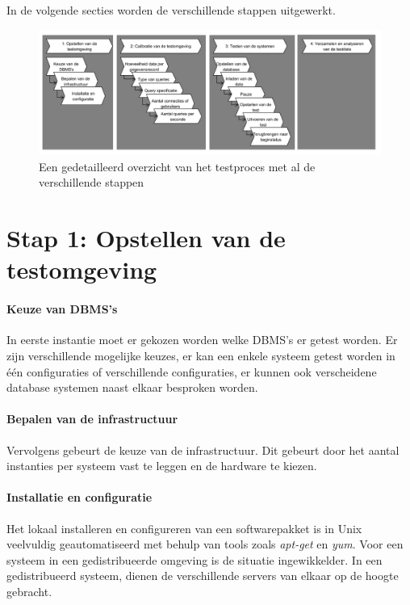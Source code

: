 In de volgende secties worden de verschillende stappen uitgewerkt.  
\begin{figure}[ht!]
\centering
\includegraphics[width=\linewidth]{img/Test-Process-Detailed-Overview}
\caption{Een gedetailleerd overzicht van het testproces met al de verschillende stappen}
\label{fig:test-process-overview}
\end{figure}

\section{Stap 1: Opstellen van de testomgeving}
\paragraph{Keuze van DBMS's} In eerste instantie moet er gekozen worden welke DBMS's er getest worden. Er zijn verschillende mogelijke keuzes, er kan een enkele systeem getest worden in één configuraties of verschillende configuraties, er kunnen ook verscheidene database systemen naast elkaar besproken worden. 

\paragraph{Bepalen van de infrastructuur} Vervolgens gebeurt de keuze van de infrastructuur. Dit gebeurt door het aantal instanties per systeem vast te leggen en de hardware te kiezen. 

\paragraph{Installatie en configuratie} Het lokaal installeren en configureren van een softwarepakket is in Unix veelvuldig geautomatiseerd met behulp van tools zoals \textit{apt-get} en \textit{yum}. Voor een systeem in een gedistribueerde omgeving is de situatie ingewikkelder. In een gedistribueerd systeem, dienen de verschillende servers van elkaar op de hoogte gebracht.

